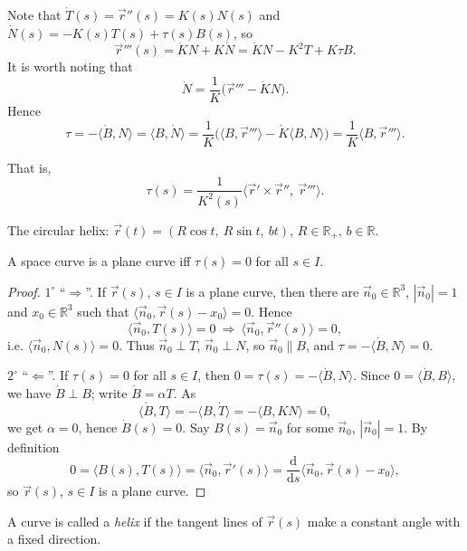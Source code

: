 \begin{remark}\label{rem:frenet-derivation}
Note that $\dot T(s)=\vec r''(s)=K(s)N(s)$ and $\dot N(s)=-K(s)T(s)+\tau(s)B(s)$, so
\[
  \vec r'''(s)=\dot KN+K\dot N=\dot KN-K^2T+K\tau B.
\]
It is worth noting that
\[
  \dot N=\frac1K\bigl(\vec r'''-\dot KN\bigr).
\]
Hence
\[
  \tau=-\langle\dot B,N\rangle=\langle B,\dot N\rangle
  =\frac1K\bigl(\langle B,\vec r'''\rangle-\dot K\langle B,N\rangle\bigr)
  =\frac1K\langle B,\vec r'''\rangle.
\]
\end{remark}

That is,
\[
  \tau(s)=\frac{1}{K^2(s)}\bigl\langle\vec r'\times\vec r'',\ \vec r'''\bigr\rangle .
\]

\begin{example}\label{ex:circular-helix}
The circular helix: $\vec r(t)=(R\cos t,\ R\sin t,\ bt)$, $R\in\mathbb{R}_+$, $b\in\mathbb{R}$.
\end{example}

\begin{proposition}\label{prop:plane-iff-zero-torsion}
A space curve is a plane curve iff $\tau(s)=0$ for all $s\in I$.
\end{proposition}

\begin{proof}
$1^\circ$ ``$\Longrightarrow$''. If $\vec r(s)$, $s\in I$ is a plane curve, then there are $\vec n_0\in\mathbb{R}^3$, $|\vec n_0|=1$ and $x_0\in\mathbb{R}^3$ such that $\langle\vec n_0,\vec r(s)-x_0\rangle=0$. Hence
\[
  \langle\vec n_0,T(s)\rangle=0
  \ \Longrightarrow\
  \langle\vec n_0,\vec r''(s)\rangle=0,
\]
i.e. $\langle\vec n_0,N(s)\rangle=0$. Thus $\vec n_0\perp T$, $\vec n_0\perp N$, so $\vec n_0\parallel B$, and $\tau=-\langle\dot B,N\rangle=0$.

$2^\circ$ ``$\Longleftarrow$''. If $\tau(s)=0$ for all $s\in I$, then $0=\tau(s)=-\langle\dot B,N\rangle$. Since $0=\langle\dot B,B\rangle$, we have $\dot B\perp B$; write $\dot B=\alpha T$. As
\[
  \langle\dot B,T\rangle=-\langle B,\dot T\rangle=-\langle B,KN\rangle=0,
\]
we get $\alpha=0$, hence $\dot B(s)=0$. Say $B(s)=\vec n_0$ for some $\vec n_0$, $|\vec n_0|=1$. By definition
\[
  0=\langle B(s),T(s)\rangle=\langle\vec n_0,\vec r'(s)\rangle
  =\frac{\mathrm d}{\mathrm ds}\bigl\langle\vec n_0,\vec r(s)-x_0\bigr\rangle,
\]
so $\vec r(s)$, $s\in I$ is a plane curve.
\end{proof}

\begin{definition}\label{def:helix}
A curve is called a \emph{helix} if the tangent lines of $\vec r(s)$ make a constant angle with a fixed direction.
\end{definition}

